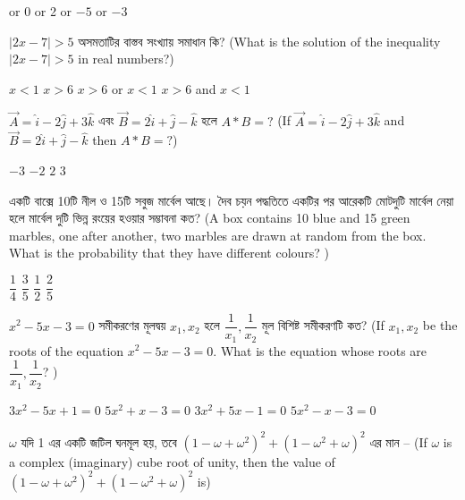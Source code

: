 \documentclass[addpoints]{exam}
\begin{document}
\begin{questions}
\begin{oneparchoices}
 or 0
 or 2 
 or $ -5 $
 or $ -3 $
\end{oneparchoices}

\question $ |2x-7|>5 $ অসমতাটির বাস্তব সংখ্যায় সমাধান কি? (What is the solution of the inequality $ |2x-7|>5 $ in real numbers?)


\begin{oneparchoices}
\choice $ x<1 $
\choice $ x>6 $
\choice $ x>6 $ or $ x<1 $
\choice $ x>6 $ and $ x<1 $
\end{oneparchoices}

\question $ \vec{A} = \hat{i}-2\hat{j}+3\hat{k} $ এবং $ \vec{B} = 2\hat{i}+\hat{j}-\hat{k} $ হলে $ A*B=? $ (If $ \vec{A} = \hat{i}-2\hat{j}+3\hat{k} $ and $ \vec{B} = 2\hat{i}+\hat{j}-\hat{k} $ then  $ A*B=? $)

\begin{oneparchoices}
\choice  $ -3 $
\choice  $ -2 $
\choice  $ 2 $
\choice  $ 3 $
\end{oneparchoices}

\question একটি বাক্সে 10টি নীল ও 15টি সবুজ মার্বেল আছে। দৈব চয়ন পদ্ধতিতে একটির পর আরেকটি মোটদুটি মার্বেল নেয়া হলে মার্বেল দুটি ভিন্ন রংয়ের হওয়ার সম্ভাবনা কত? (A box contains 10 blue and 15 green marbles, one after another, two marbles are drawn at random from the box. What is the probability that they have different colours?  )


\begin{oneparchoices}
\choice $ \dfrac{1}{4} $
\choice $ \dfrac{3}{5} $
\choice $ \dfrac{1}{2} $
\choice  $ \dfrac{2}{5} $
\end{oneparchoices}

\question $ x^{2}-5x-3= 0 $ সমীকরণের মূলদ্বয় $ x_{1},x_{2} $ হলে $ \dfrac{1}{x_{1}},\dfrac{1}{x_{2}} $ মূল বিশিষ্ট সমীকরণটি কত? (If $ x_{1},x_{2} $ be the roots of the equation $ x^{2}-5x-3= 0 $. What is the equation whose roots are $ \dfrac{1}{x_{1}},\dfrac{1}{x_{2}} $? )


\begin{oneparchoices}
\choice $ 3x^{2}-5x+1= 0 $
\choice $ 5x^{2}+x-3= 0 $
\choice $ 3x^{2}+5x-1= 0 $
\choice $ 5x^{2}-x-3= 0 $
\end{oneparchoices}

\question $ \omega $ যদি 1 এর একটি জটিল ঘনমূল হয়, তবে $ (1-\omega +\omega^{2})^{2}+(1-\omega^{2}+\omega)^{2} $ এর মান – (If $ \omega $ is a complex (imaginary) cube root of unity, then the value of $ (1-\omega +\omega^{2})^{2}+(1-\omega^{2}+\omega)^{2} $ is)
 

\end{questions}
\end{document}
